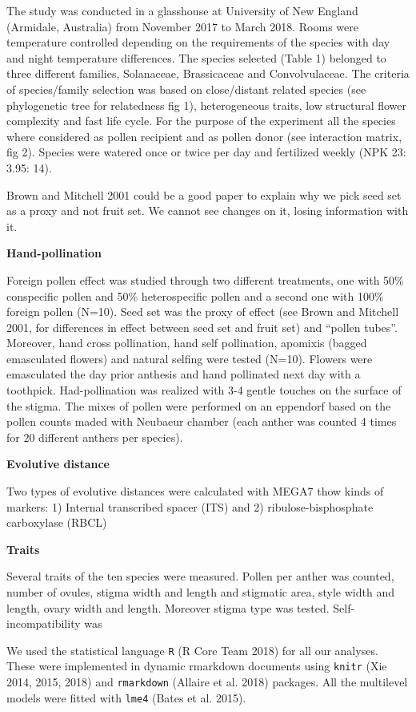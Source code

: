 \documentclass[11pt,a4paper]{article}
\begin{document}
The study was conducted in a glasshouse at University of New England
(Armidale, Australia) from November 2017 to March 2018. Rooms were
temperature controlled depending on the requirements of the species with
day and night temperature differences. The species selected (Table 1)
belonged to three different families, Solanaceae, Brassicaceae and
Convolvulaceae. The criteria of species/family selection was based on
close/distant related species (see phylogenetic tree for relatedness fig
1), heterogeneous traits, low structural flower complexity and fast life
cycle. For the purpose of the experiment all the species where
considered as pollen recipient and as pollen donor (see interaction
matrix, fig 2). Species were watered once or twice per day and
fertilized weekly (NPK 23: 3.95: 14).

Brown and Mitchell 2001 could be a good paper to explain why we pick
seed set as a proxy and not fruit set. We cannot see changes on it,
losing information with it.

\textbf{Hand-pollination}

Foreign pollen effect was studied through two different treatments, one
with 50\% conspecific pollen and 50\% heterospecific pollen and a second
one with 100\% foreign pollen (N=10). Seed set was the proxy of effect
(see Brown and Mitchell 2001, for differences in effect between seed set
and fruit set) and ``pollen tubes''. Moreover, hand cross pollination,
hand self pollination, apomixis (bagged emasculated flowers) and natural
selfing were tested (N=10). Flowers were emasculated the day prior
anthesis and hand pollinated next day with a toothpick. Had-pollination
was realized with 3-4 gentle touches on the surface of the stigma. The
mixes of pollen were performed on an eppendorf based on the pollen
counts maded with Neubaeur chamber (each anther was counted 4 times for
20 different anthers per species).

\textbf{Evolutive distance}

Two types of evolutive distances were calculated with MEGA7 thow kinds
of markers: 1) Internal transcribed spacer (ITS) and 2)
ribulose-bisphosphate carboxylase (RBCL)

\textbf{Traits}

Several traits of the ten species were measured. Pollen per anther was
counted, number of ovules, stigma width and length and stigmatic area,
style width and length, ovary width and length. Moreover stigma type was
tested. Self-incompatibility was

We used the statistical language \texttt{R} (R Core Team 2018) for all
our analyses. These were implemented in dynamic rmarkdown documents
using \texttt{knitr} (Xie 2014, 2015, 2018) and \texttt{rmarkdown}
(Allaire et al. 2018) packages. All the multilevel models were fitted
with \texttt{lme4} (Bates et al. 2015).
\end{document}
